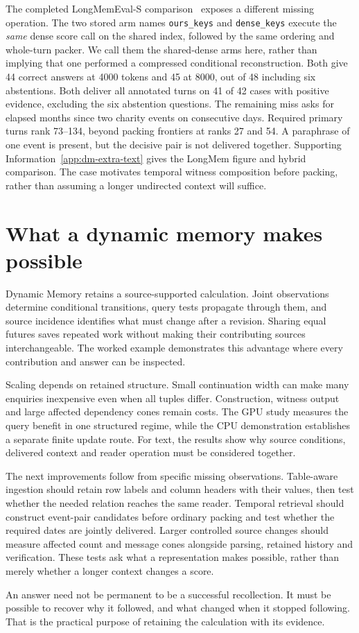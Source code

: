 \documentclass[reprint,aps,prx,superscriptaddress,nofootinbib,longbibliography]{revtex4-2}
\begin{document}
The completed LongMemEval-S comparison~\cite{longmem} exposes a different missing operation.
The two stored arm names \texttt{ours\_keys} and \texttt{dense\_keys} execute the \emph{same} dense score call on the shared index, followed by the same ordering and whole-turn packer.
We call them the shared-dense arms here, rather than implying that one performed a compressed conditional reconstruction.
Both give 44 correct answers at 4000 tokens and 45 at 8000, out of 48 including six abstentions.
Both deliver all annotated turns on 41 of 42 cases with positive evidence, excluding the six abstention questions.
The remaining miss asks for elapsed months since two charity events on consecutive days.
Required primary turns rank 73--134, beyond packing frontiers at ranks 27 and 54.
A paraphrase of one event is present, but the decisive pair is not delivered together.
Supporting Information~\ref{app:dm-extra-text} gives the LongMem figure and hybrid comparison.
The case motivates temporal witness composition before packing, rather than assuming a longer undirected context will suffice.

\section{What a dynamic memory makes possible}
\label{sec:outlook}
Dynamic Memory retains a source-supported calculation.
Joint observations determine conditional transitions, query tests propagate through them, and source incidence identifies what must change after a revision.
Sharing equal futures saves repeated work without making their contributing sources interchangeable.
The worked example demonstrates this advantage where every contribution and answer can be inspected.

Scaling depends on retained structure.
Small continuation width can make many enquiries inexpensive even when all tuples differ.
Construction, witness output and large affected dependency cones remain costs.
The GPU study measures the query benefit in one structured regime, while the CPU demonstration establishes a separate finite update route.
For text, the results show why source conditions, delivered context and reader operation must be considered together.

The next improvements follow from specific missing observations.
Table-aware ingestion should retain row labels and column headers with their values, then test whether the needed relation reaches the same reader.
Temporal retrieval should construct event-pair candidates before ordinary packing and test whether the required dates are jointly delivered.
Larger controlled source changes should measure affected count and message cones alongside parsing, retained history and verification.
These tests ask what a representation makes possible, rather than merely whether a longer context changes a score.

An answer need not be permanent to be a successful recollection.
It must be possible to recover why it followed, and what changed when it stopped following.
That is the practical purpose of retaining the calculation with its evidence.
\clearpage
\appendix

\clearpage

\end{document}
